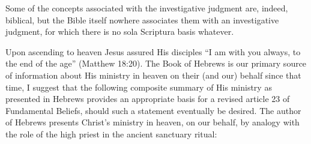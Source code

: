 Some of the concepts associated with the investigative judgment are, indeed,
biblical, but the Bible itself nowhere associates them with an investigative
judgment, for which there is no sola Scriptura basis whatever.

Upon ascending to heaven Jesus assured His disciples ``I am with you always,
to the end of the age'' (Matthew 18:20). The Book of Hebrews is our primary
source of information about His ministry in heaven on their (and our) behalf
since that time, I suggest that the following composite summary of His
ministry as presented in Hebrews provides an appropriate basis for a revised
article 23 of Fundamental Beliefs, should such a statement eventually be
desired. The author of Hebrews presents Christ's ministry in heaven, on our
behalf, by analogy with the role of the high priest in the ancient sanctuary
ritual: 

